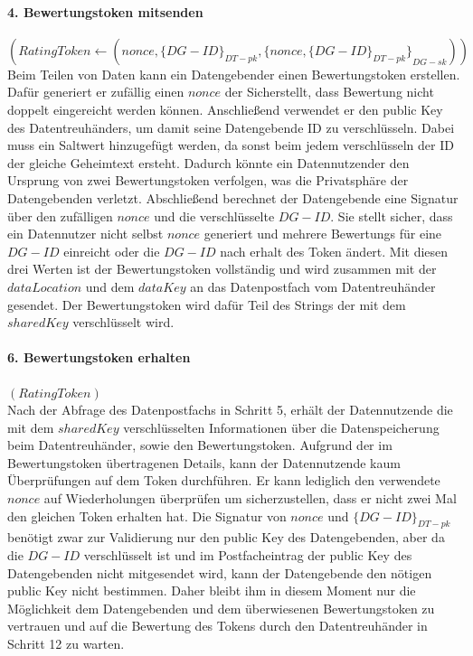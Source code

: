 \documentclass{scrreprt}
\begin{document}
\paragraph{4. Bewertungstoken mitsenden}$(RatingToken \leftarrow (nonce, {\{DG-ID\}}_{DT-pk},{\{nonce, {\{DG-ID\}}_{DT-pk}\}}_{DG-sk}))$\\
Beim Teilen von Daten kann ein Datengebender einen Bewertungstoken erstellen. Dafür generiert er zufällig einen $nonce$ der Sicherstellt, dass Bewertung nicht doppelt eingereicht werden können. Anschließend verwendet er den public Key des Datentreuhänders, um damit seine Datengebende ID zu verschlüsseln. Dabei muss ein Saltwert hinzugefügt werden, da sonst beim jedem verschlüsseln der ID der gleiche Geheimtext ersteht. Dadurch könnte ein Datennutzender den Ursprung von zwei Bewertungstoken verfolgen, was die Privatsphäre der Datengebenden verletzt. Abschließend berechnet der Datengebende eine Signatur über den zufälligen $nonce$ und die verschlüsselte $DG-ID$. Sie stellt sicher, dass ein Datennutzer nicht selbst $nonce$ generiert und mehrere Bewertungs für eine $DG-ID$ einreicht oder die $DG-ID$ nach erhalt des Token ändert. Mit diesen drei Werten ist der Bewertungstoken vollständig und wird zusammen mit der $dataLocation$ und dem $dataKey$ an das Datenpostfach vom Datentreuhänder gesendet. Der Bewertungstoken wird dafür Teil des Strings der mit dem $sharedKey$ verschlüsselt wird.

\paragraph{6. Bewertungstoken erhalten}$(RatingToken)$\\
Nach der Abfrage des Datenpostfachs in Schritt 5, erhält der Datennutzende die mit dem $sharedKey$ verschlüsselten Informationen über die Datenspeicherung beim Datentreuhänder, sowie den Bewertungstoken. Aufgrund der im Bewertungstoken übertragenen Details, kann der Datennutzende kaum Überprüfungen auf dem Token durchführen. Er kann lediglich den verwendete $nonce$ auf Wiederholungen überprüfen um sicherzustellen, dass er nicht zwei Mal den gleichen Token erhalten hat. Die Signatur von $nonce$ und ${\{DG-ID\}}_{DT-pk}$ benötigt zwar zur Validierung nur den public Key des Datengebenden, aber da die $DG-ID$ verschlüsselt ist und im Postfacheintrag der public Key des Datengebenden nicht mitgesendet wird, kann der Datengebende den nötigen public Key nicht bestimmen. Daher bleibt ihm in diesem Moment nur die Möglichkeit dem Datengebenden und dem überwiesenen Bewertungstoken zu vertrauen und auf die Bewertung des Tokens durch den Datentreuhänder in Schritt 12 zu warten.
\end{document}
